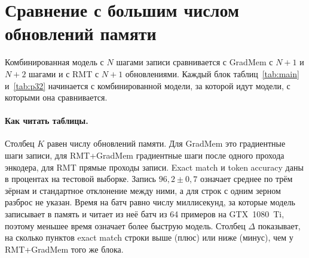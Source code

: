 \documentclass[a4paper,11pt]{article}
\begin{document}
\section{Сравнение с большим числом обновлений памяти}
Комбинированная модель с $N$ шагами записи сравнивается с GradMem с $N+1$ и $N+2$ шагами и с RMT с $N+1$ обновлениями. Каждый блок таблиц~\ref{tab:main} и~\ref{tab:p32} начинается с комбинированной модели, за которой идут модели, с которыми она сравнивается.

\paragraph{Как читать таблицы.} Столбец $K$ равен числу обновлений памяти. Для GradMem это градиентные шаги записи, для RMT+GradMem градиентные шаги после одного прохода энкодера, для RMT прямые проходы записи. Exact match и token accuracy даны в процентах на тестовой выборке. Запись $96{,}2\pm0{,}7$ означает среднее по трём зёрнам и стандартное отклонение между ними, а для строк с одним зерном разброс не указан. Время на батч равно числу миллисекунд, за которые модель записывает в память и читает из неё батч из 64 примеров на GTX~1080~Ti, поэтому меньшее время означает более быструю модель. Столбец $\Delta$ показывает, на сколько пунктов exact match строки выше (плюс) или ниже (минус), чем у RMT+GradMem того же блока.
\end{document}
